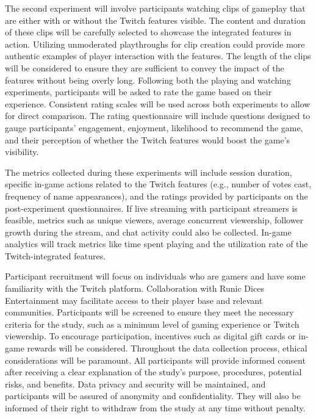 \documentclass[conference]{IEEEtran}
\begin{document}
The second experiment will involve participants watching clips of gameplay that are either with or without the Twitch features visible. The content and duration of these clips will be carefully selected to showcase the integrated features in action. Utilizing unmoderated playthroughs for clip creation could provide more authentic examples of player interaction with the features. The length of the clips will be considered to ensure they are sufficient to convey the impact of the features without being overly long. Following both the playing and watching experiments, participants will be asked to rate the game based on their experience. Consistent rating scales will be used across both experiments to allow for direct comparison. The rating questionnaire will include questions designed to gauge participants' engagement, enjoyment, likelihood to recommend the game, and their perception of whether the Twitch features would boost the game's visibility.

The metrics collected during these experiments will include session duration, specific in-game actions related to the Twitch features (e.g., number of votes cast, frequency of name appearances), and the ratings provided by participants on the post-experiment questionnaires. If live streaming with participant streamers is feasible, metrics such as unique viewers, average concurrent viewership, follower growth during the stream, and chat activity could also be collected. In-game analytics will track metrics like time spent playing and the utilization rate of the Twitch-integrated features.

Participant recruitment will focus on individuals who are gamers and have some familiarity with the Twitch platform. Collaboration with Runic Dices Entertainment may facilitate access to their player base and relevant communities. Participants will be screened to ensure they meet the necessary criteria for the study, such as a minimum level of gaming experience or Twitch viewership. To encourage participation, incentives such as digital gift cards or in-game rewards will be considered. Throughout the data collection process, ethical considerations will be paramount. All participants will provide informed consent after receiving a clear explanation of the study's purpose, procedures, potential risks, and benefits. Data privacy and security will be maintained, and participants will be assured of anonymity and confidentiality. They will also be informed of their right to withdraw from the study at any time without penalty.
\end{document}

